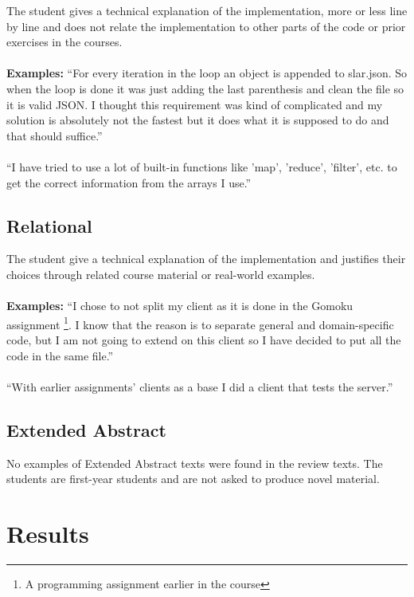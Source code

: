 \documentclass[twoside,twocolumn,a4paper,11pt,english]{article}
\begin{document}
The student gives a technical explanation of the implementation, more or less line by line and does not relate the implementation to other parts of the code or prior exercises in the courses.
\\
\\
\textbf{Examples:} ``For every iteration in the loop an object is appended to slar.json. So when the loop is done it was just adding the last parenthesis and clean the file so it is valid JSON. I thought this requirement was kind of complicated and my solution is absolutely not the fastest but it does what it is supposed to do and that should suffice.''
\\
\\
``I have tried to use a lot of built-in functions like 'map', 'reduce', 'filter', etc. to get the correct information from the arrays I use.''

\subsection{Relational}

The student give a technical explanation of the implementation and justifies their choices through related course material or real-world examples.
\\
\\
\textbf{Examples:} ``I chose to not split my client as it is done in the Gomoku assignment \footnote{A programming assignment earlier in the course}. I know that the reason is to separate general and domain-specific code, but I am not going to extend on this client so I have decided to put all the code in the same file.''
\\
\\
``With earlier assignments' clients as a base I did a client that tests the server.''

\subsection{Extended Abstract}

No examples of Extended Abstract texts were found in the review texts. The students are first-year students and are not asked to produce novel material.




\section{Results}
\end{document}
